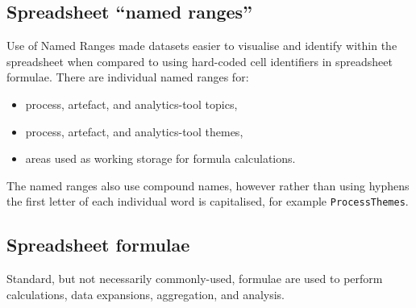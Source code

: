 \subsection{Spreadsheet ``named ranges''}
Use of Named Ranges made datasets easier to visualise and identify within the spreadsheet when compared to using hard-coded cell identifiers in spreadsheet formulae. There are individual named ranges for:
\begin{itemize}
    \item process, artefact, and analytics-tool topics,
    \item process, artefact, and analytics-tool themes,
    \item areas used as working storage for formula calculations.
\end{itemize}

The named ranges also use compound names, however rather than using hyphens the first letter of each individual word is capitalised, for example \texttt{ProcessThemes}.%

\subsection{Spreadsheet formulae}
Standard, but not necessarily commonly-used, formulae are used to perform calculations, data expansions, aggregation, and analysis. 

